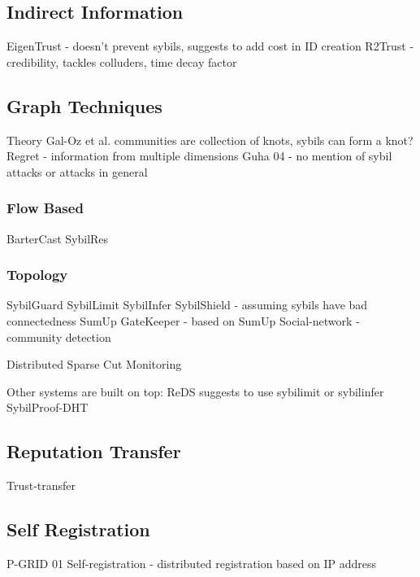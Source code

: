\subsection{Indirect Information}
EigenTrust\cite{kamvar2003eigentrust} - doesn't prevent sybils, suggests to add cost in ID creation
R2Trust\cite{tian2011h2trust} - credibility, tackles colluders, time decay factor

\subsection{Graph Techniques}\label{sec:graph}
Theory\cite{seuken2011sybil}
Gal-Oz et al. \cite{gal2008robust} communities are collection of knots, sybils can form a knot?
Regret\cite{sabater2001regret, sabater2002social} - information from multiple dimensions
Guha 04\cite{guha2004propagation} - no mention of sybil attacks or attacks in general

\subsubsection{Flow Based}
BarterCast\cite{meulpolder2009bartercast}
SybilRes\cite{delaviz2012sybilres}

\subsubsection{Topology}
SybilGuard\cite{yu2006sybilguard}
SybilLimit\cite{yu2008sybillimit}
SybilInfer\cite{danezis2009sybilinfer}
SybilShield\cite{shi2013sybilshield} - assuming sybils have bad connectedness
SumUp\cite{tran2009sybil}
GateKeeper\cite{tran2011optimal} - based on SumUp
Social-network\cite{viswanath2010analysis} - community detection

Distributed Sparse Cut Monitoring\cite{kurve2011sybil}

Other systems are built on top:
ReDS\cite{akavipat2014reds} suggests to use sybilimit or sybilinfer
SybilProof-DHT\cite{lesniewski2010whanau}
\subsection{Reputation Transfer}
Trust-transfer\cite{seigneur2005trust}

\subsection{Self Registration}
P-GRID 01\cite{aberer2001p}
Self-registration\cite{dinger2006defending} - distributed registration based on IP address

